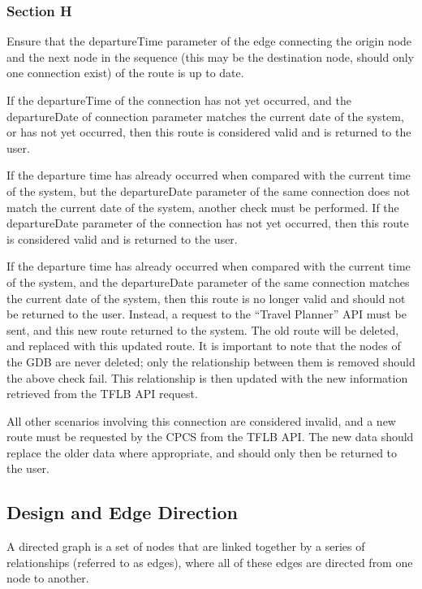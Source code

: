 \documentclass[12pt]{article}   	%
\begin{document}
\subsubsection{Section H}
Ensure that the departureTime parameter of the edge connecting the origin node and the next node in the sequence (this may be the destination node, should only one connection exist) of the route is up to date.

If the departureTime of the connection has not yet occurred, and the departureDate of connection parameter matches the current date of the system, or has not yet occurred, then this route is considered valid and is returned to the user.

If the departure time has already occurred when compared with the current time of the system, but the departureDate parameter of the same connection does not match the current date of the system, another check must be performed. If the departureDate parameter of the connection has not yet occurred, then this route is considered valid and is returned to the user.

If the departure time has already occurred when compared with the current time of the system, and the departureDate parameter of the same connection matches the current date of the system, then this route is no longer valid and should not be returned to the user. Instead, a request to the “Travel Planner” API must be sent, and this new route returned to the system. The old route will be deleted, and replaced with this updated route. It is important to note that the nodes of the GDB are never deleted; only the relationship between them is removed should the above check fail. This relationship is then updated with the new information retrieved from the TFLB API request.

All other scenarios involving this connection are considered invalid, and a new route must be requested by the CPCS from the TFLB API. The new data should replace the older data where appropriate, and should only then be returned to the user.

\subsection{Design and Edge Direction}
A directed graph is a set of nodes that are linked together by a series of relationships (referred to as edges), where all of these edges are directed from one node to another.
\end{document}
